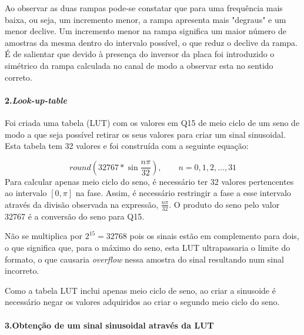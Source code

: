 \documentclass[11pt]{article}
\numberwithin{equation}{section}
\begin{document}
Ao observar as duas rampas pode-se constatar que para uma frequência mais baixa, ou seja, um incremento menor, a rampa apresenta mais "degraus" e um menor declive. Um incremento menor na rampa significa um maior número de amostras da mesma dentro do intervalo possível, o que reduz o declive da rampa. É de salientar que devido à presença do inversor da placa foi introduzido o simétrico da rampa calculada no canal de modo a observar esta no sentido correto.
\paragraph{2.\textit{Look-up-table}} \hspace{0pt}

Foi criada uma tabela (LUT) com os valores em Q15 de meio ciclo de um seno de modo a que seja possível retirar os seus valores para criar um sinal sinusoidal. Esta tabela tem 32 valores e foi construída com a seguinte equação:

\begin{equation}
round \left(32767*\sin \dfrac{n \pi}{32} \right),  \quad \quad n=0,1,2,...,31
\end{equation}                                                                                                                                                                                                                                             
Para calcular apenas meio ciclo do seno, é necessário ter 32 valores pertencentes ao intervalo $[0,\pi]$ na fase. Assim, é necessário restringir a fase a esse intervalo através da divisão observada na expressão, $\frac{n \pi}{32}$. O produto do seno pelo valor 32767 é a conversão do seno para Q15. 
                                                                     
Não se multiplica por $2 ^{15}=32768$ pois os sinais estão em complemento para dois, o que significa que, para o máximo do seno, esta LUT ultrapassaria o limite do formato, o que causaria \textit{overflow} nessa amostra do sinal resultando num sinal incorreto. 

Como a tabela LUT inclui apenas meio ciclo de seno, ao criar a sinusoide é necessário negar os valores adquiridos ao criar o segundo meio ciclo do seno.

\paragraph{3.Obtenção de um sinal sinusoidal através da LUT} \hspace{0pt}
\end{document}
